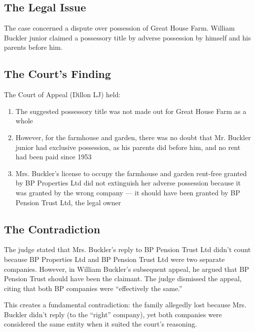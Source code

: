 \documentclass[11pt,a4paper]{article}
\begin{document}
\subsection{The Legal Issue}

The case concerned a dispute over possession of Great House Farm. William Buckler junior claimed a possessory title by adverse possession by himself and his parents before him.

\subsection{The Court's Finding}

The Court of Appeal (Dillon LJ) held:

\begin{enumerate}[label=\arabic*.]
    \item The suggested possessory title was not made out for Great House Farm as a whole
    \item However, for the farmhouse and garden, there was no doubt that Mr. Buckler junior had exclusive possession, as his parents did before him, and no rent had been paid since 1953
    \item Mrs. Buckler's license to occupy the farmhouse and garden rent-free granted by BP Properties Ltd did not extinguish her adverse possession because it was granted by the wrong company --- it should have been granted by BP Pension Trust Ltd, the legal owner
\end{enumerate}

\subsection{The Contradiction}

\begin{grievance}
The judge stated that Mrs. Buckler's reply to BP Pension Trust Ltd didn't count because BP Properties Ltd and BP Pension Trust Ltd were two separate companies. However, in William Buckler's subsequent appeal, he argued that BP Pension Trust should have been the claimant. The judge dismissed the appeal, citing that both BP companies were ``effectively the same.''

This creates a fundamental contradiction: the family allegedly lost because Mrs. Buckler didn't reply (to the ``right'' company), yet both companies were considered the same entity when it suited the court's reasoning.
\end{grievance}
\end{document}
